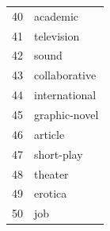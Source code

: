 \documentclass[]{report}   %
\begin{document}
\begin{figure}
\begin{minipage}[t]{0.24\textwidth}
\begin{tabular}{rl}
  40 & academic \\ 
  41 & television \\ 
  42 & sound \\ 
  43 & collaborative \\ 
  44 & international \\ 
  45 & graphic-novel \\ 
  46 & article \\ 
  47 & short-play \\ 
  48 & theater \\ 
  49 & erotica \\ 
  50 & job \\ 
  \hline
\end{tabular}
    \end{minipage}
\begin{minipage}[t]{0.24\textwidth}


\end{minipage}
\end{figure}
\end{document}
